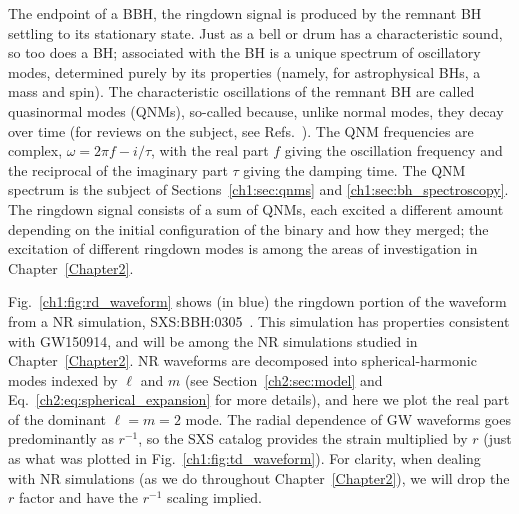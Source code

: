 The endpoint of a BBH, the ringdown signal is produced by the remnant BH settling to its stationary state.
Just as a bell or drum has a characteristic sound, so too does a BH; associated with the BH is a unique spectrum of oscillatory modes, determined purely by its properties (namely, for astrophysical BHs, a mass and spin).
The characteristic oscillations of the remnant BH are called quasinormal modes (QNMs), so-called because, unlike normal modes, they decay over time (for reviews on the subject, see Refs.~\cite{Kokkotas:1999bd, Nollert:1999ji, Ferrari:2007dd, Berti:2009kk}).
The QNM frequencies are complex, $\omega = 2\pi f - i/\tau$, with the real part $f$ giving the oscillation frequency and the reciprocal of the imaginary part $\tau$ giving the damping time. 
The QNM spectrum is the subject of Sections~\ref{ch1:sec:qnms} and \ref{ch1:sec:bh_spectroscopy}.
The ringdown signal consists of a sum of QNMs, each excited a different amount depending on the initial configuration of the binary and how they merged; the excitation of different ringdown modes is among the areas of investigation in Chapter~\ref{Chapter2}.

Fig.~\ref{ch1:fig:rd_waveform} shows (in blue) the ringdown portion of the waveform from a NR simulation, SXS:BBH:0305~\cite{Lovelace:2016uwp}.
This simulation has properties consistent with GW150914, and will be among the NR simulations studied in Chapter~\ref{Chapter2}.
NR waveforms are decomposed into spherical-harmonic modes indexed by $\ell$ and $m$ (see Section~\ref{ch2:sec:model} and Eq.~\ref{ch2:eq:spherical_expansion} for more details), and here we plot the real part of the dominant $\ell = m = 2$ mode.
The radial dependence of GW waveforms goes predominantly as $r^{-1}$, so the SXS catalog provides the strain multiplied by $r$ (just as what was plotted in Fig.~\ref{ch1:fig:td_waveform}).
For clarity, when dealing with NR simulations (as we do throughout Chapter~\ref{Chapter2}), we will drop the $r$ factor and have the $r^{-1}$ scaling implied.

